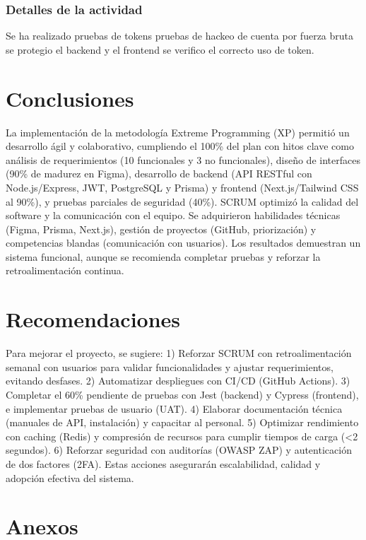 \documentclass[12pt,a4paper]{article}
\begin{document}
\subsubsection{Detalles de la actividad}
Se ha realizado pruebas de tokens pruebas de hackeo de cuenta por fuerza bruta se protegio el backend y el frontend se verifico el correcto uso de token.





\section{Conclusiones}
La implementación de la metodología Extreme Programming (XP) permitió un desarrollo ágil y colaborativo, cumpliendo el 100\% del plan con hitos clave como análisis de requerimientos (10 funcionales y 3 no funcionales), diseño de interfaces (90\% de madurez en Figma), desarrollo de backend (API RESTful con Node.js/Express, JWT, PostgreSQL y Prisma) y frontend (Next.js/Tailwind CSS al 90\%), y pruebas parciales de seguridad (40\%). SCRUM optimizó la calidad del software y la comunicación con el equipo. Se adquirieron habilidades técnicas (Figma, Prisma, Next.js), gestión de proyectos (GitHub, priorización) y competencias blandas (comunicación con usuarios). Los resultados demuestran un sistema funcional, aunque se recomienda completar pruebas y reforzar la retroalimentación continua.
\section{Recomendaciones}
Para mejorar el proyecto, se sugiere: 1) Reforzar SCRUM con retroalimentación semanal con usuarios para validar funcionalidades y ajustar requerimientos, evitando desfases. 2) Automatizar despliegues con CI/CD (GitHub Actions). 3) Completar el 60\% pendiente de pruebas con Jest (backend) y Cypress (frontend), e implementar pruebas de usuario (UAT). 4) Elaborar documentación técnica (manuales de API, instalación) y capacitar al personal. 5) Optimizar rendimiento con caching (Redis) y compresión de recursos para cumplir tiempos de carga (<2 segundos). 6) Reforzar seguridad con auditorías (OWASP ZAP) y autenticación de dos factores (2FA). Estas acciones asegurarán escalabilidad, calidad y adopción efectiva del sistema.

\newpage
\section{Anexos}
\end{document}
